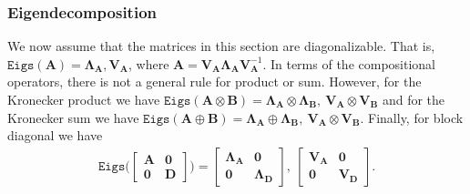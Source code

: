\documentclass{article}
\newcommand{\mbf}[1]{{\boldsymbol{\mathbf{#1}}}}
\renewcommand{\bm}{\mbf}
\begin{document}
\subsubsection{Eigendecomposition}
We now assume that the matrices in this section are diagonalizable.
That is,  $\texttt{Eigs}\left(\bm{A}\right)= \bm{\Lambda}_{\bm{A}}, \bm{V}_{\bm{A}}$, where
$\bm{A} = \bm{V}_{\bm{A}} \bm{\Lambda}_{\bm{A}} \bm{V}_{\bm{A}}^{-1}$.
In terms of the compositional operators, there is not a general rule for product or sum.
However, for the Kronecker product we have
$\texttt{Eigs}(\bm A\otimes \bm B) = \bm{\Lambda}_{\bm{A}} \otimes \bm{\Lambda}_{\bm{B}},\ \bm{V}_{\bm{A}} \otimes \bm{V}_{\bm{B}} $
and for the Kronecker sum we have
$\texttt{Eigs}(\bm A\oplus \bm B) = \bm{\Lambda}_{\bm{A}} \oplus \bm{\Lambda}_{\bm{B}},\ \bm{V}_{\bm{A}} \otimes \bm{V}_{\bm{B}} $.
Finally, for block diagonal we have
\begin{equation*}
    \begin{split}
    \texttt{Eigs}\bigg({\begin{bmatrix} \bm{A} & \bm{0} \\ \bm{0} & \bm{D} \end{bmatrix} }\bigg)
    =
      \begin{bmatrix} \bm{\Lambda_A} & \bm{0} \\ \bm{0} & \bm{\Lambda_D} \end{bmatrix}, \ \begin{bmatrix} \bm{V_A} & \bm{0} \\ \bm{0} & \bm{V_D} \end{bmatrix}
  .
    \end{split}
\end{equation*}
\end{document}
